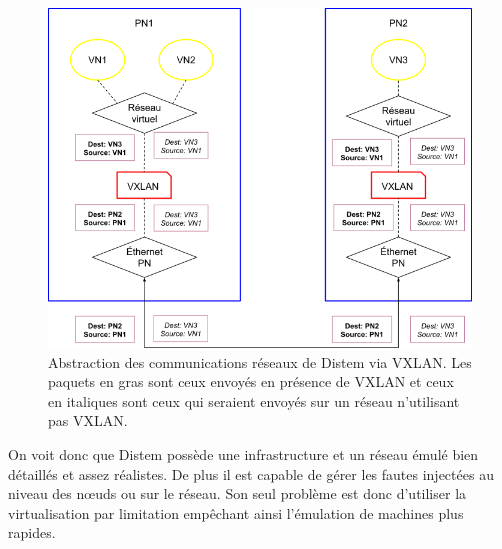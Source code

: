 \begin{figure}[H]
  \centering
  \includegraphics[scale=0.45]{Pictures/png/Distem_VXLAN}
  \caption{Abstraction des communications réseaux de Distem via VXLAN. Les paquets en gras sont ceux envoyés en présence de VXLAN et ceux en italiques sont ceux qui seraient envoyés sur un réseau n'utilisant pas VXLAN.}
  \label{Distem_VXLAN}
\end{figure}

On voit donc que Distem possède une infrastructure et un réseau émulé bien
détaillés et assez réalistes. De plus il est capable de gérer les fautes
injectées au niveau des n\oe uds ou sur le réseau. Son seul problème est donc d'utiliser la virtualisation par limitation empêchant ainsi l'émulation de machines plus rapides.
